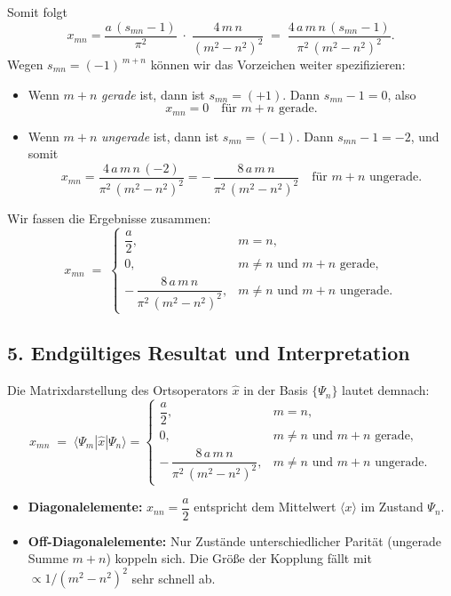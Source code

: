 \documentclass{scrartcl}
\begin{document}
Somit folgt
\[
x_{mn}
= \frac{a\,(s_{mn} - 1)}{\pi^{2}}
\;\cdot\;
\frac{4\,m\,n}{(m^{2} - n^{2})^{2}}
\;=\;
\frac{4\,a\,m\,n\,(s_{mn} - 1)}{\pi^{2}\,(m^{2} - n^{2})^{2}}.
\]
Wegen \(s_{mn} = (-1)^{\,m+n}\) können wir das Vorzeichen weiter spezifizieren:
\begin{itemize}
  \item Wenn \(m + n\) \emph{gerade} ist, dann ist \(s_{mn} = (+1)\). Dann \(s_{mn} - 1 = 0\), also
  \[
  x_{mn} = 0 \quad\text{für \(m+n\) gerade.}
  \]
  \item Wenn \(m + n\) \emph{ungerade} ist, dann ist \(s_{mn} = (-1)\). Dann \(s_{mn} - 1 = -2\), und somit
  \[
  x_{mn}
  = \frac{4\,a\,m\,n\,(-2)}{\pi^{2}\,(m^{2} - n^{2})^{2}}
  = -\,\frac{8\,a\,m\,n}{\pi^{2}\,(m^{2} - n^{2})^{2}}
  \quad\text{für \(m+n\) ungerade.}
  \]
\end{itemize}

Wir fassen die Ergebnisse zusammen:
\[
x_{mn} \;=\;
\begin{cases}
\dfrac{a}{2}, & m = n,\\[1em]
0, & m \neq n \text{ und } m+n \text{ gerade},\\[1em]
-\,\dfrac{8\,a\,m\,n}{\pi^{2}\,(m^{2} - n^{2})^{2}}, 
& m \neq n \text{ und } m+n \text{ ungerade}.
\end{cases}
\]

\bigskip

\subsection*{5. Endgültiges Resultat und Interpretation}

Die Matrixdarstellung des Ortsoperators $\hat{x}$ in der Basis $\{\Psi_n\}$ lautet demnach:
\[
\boxed{
x_{mn} \;=\; 
\langle \Psi_m | \hat{x} | \Psi_n \rangle
=
\begin{cases}
\dfrac{a}{2}, 
& m = n,\\[1em]
0, 
& m \neq n \text{ und } m+n \text{ gerade},\\[1em]
-\,\dfrac{8\,a\,m\,n}{\pi^{2}\,(m^{2} - n^{2})^{2}}, 
& m \neq n \text{ und } m+n \text{ ungerade}.
\end{cases}
}
\]
\begin{itemize}
  \item \textbf{Diagonalelemente:} $x_{nn} = \dfrac{a}{2}$ entspricht dem Mittelwert $\langle x \rangle$ im Zustand $\Psi_n$.
  \item \textbf{Off-Diagonalelemente:} Nur Zustände unterschiedlicher Parität (ungerade Summe \(m+n\)) koppeln sich. Die Größe der Kopplung fällt mit \(\propto 1/(m^{2}-n^{2})^{2}\) sehr schnell ab.
\end{itemize}
\end{document}
